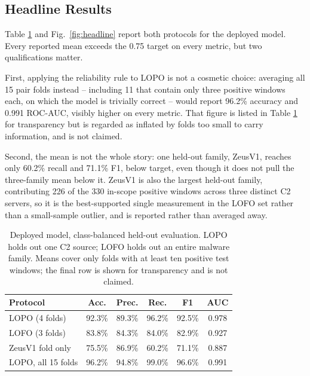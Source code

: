 \documentclass[conference,a4paper]{IEEEtran}
\begin{document}
\subsection{Headline Results}\label{sec:headline}
Table \ref{tab:headline} and Fig.~\ref{fig:headline} report both protocols for the deployed model. Every reported mean exceeds the 0.75 target on every metric, but two qualifications matter.

First, applying the reliability rule to LOPO is not a cosmetic choice: averaging all 15 pair folds instead -- including 11 that contain only three positive windows each, on which the model is trivially correct -- would report 96.2\% accuracy and 0.991 ROC-AUC, visibly higher on every metric. That figure is listed in Table \ref{tab:headline} for transparency but is regarded as inflated by folds too small to carry information, and is not claimed.

Second, the mean is not the whole story: one held-out family, ZeusV1, reaches only 60.2\% recall and 71.1\% F1, below target, even though it does not pull the three-family mean below it. ZeusV1 is also the largest held-out family, contributing 226 of the 330 in-scope positive windows across three distinct C2 servers, so it is the best-supported single measurement in the LOFO set rather than a small-sample outlier, and is reported rather than averaged away.

\begin{table}[t]
\caption{Deployed model, class-balanced held-out evaluation. LOPO holds out one C2 source; LOFO holds out an entire malware family. Means cover only folds with at least ten positive test windows; the final row is shown for transparency and is not claimed.}
\label{tab:headline}
\centering
\footnotesize
\setlength{\tabcolsep}{3.4pt}
\begin{tabular}{lccccc}
\toprule
\textbf{Protocol} & \textbf{Acc.} & \textbf{Prec.} & \textbf{Rec.} & \textbf{F1} & \textbf{AUC} \\
\midrule
LOPO (4 folds) & 92.3\% & 89.3\% & 96.2\% & 92.5\% & 0.978 \\
LOFO (3 folds) & 83.8\% & 84.3\% & 84.0\% & 82.9\% & 0.927 \\
\midrule
\quad ZeusV1 fold only & 75.5\% & 86.9\% & 60.2\% & 71.1\% & 0.887 \\
\quad LOPO, all 15 folds & 96.2\% & 94.8\% & 99.0\% & 96.6\% & 0.991 \\
\bottomrule
\end{tabular}
\end{table}
\end{document}
